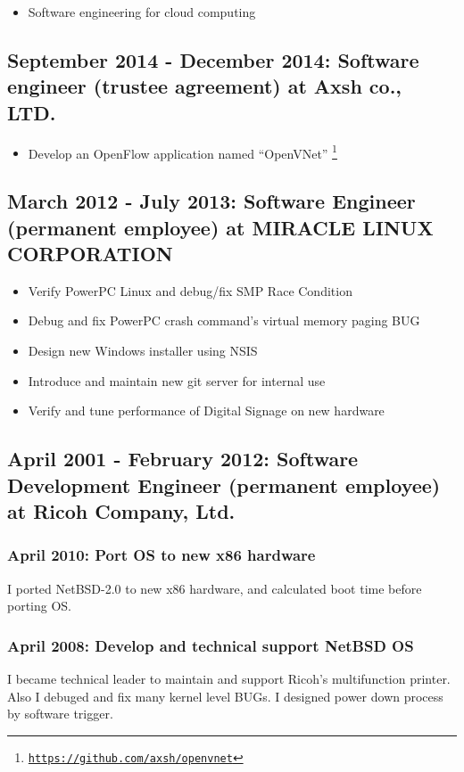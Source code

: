 \documentclass[letterpaper]{article}
\begin{document}
\begin{itemize}
  \item Software engineering for cloud computing
\end{itemize}

\subsection*{September 2014 - December 2014: Software engineer (trustee agreement) at Axsh co., LTD.}

\begin{itemize}
  \item Develop an OpenFlow application named ``OpenVNet'' \footnote{\href{https://github.com/axsh/openvnet}{\tt https://github.com/axsh/openvnet}}
\end{itemize}

\subsection*{March 2012 - July 2013: Software Engineer (permanent employee) at MIRACLE LINUX CORPORATION}

\begin{itemize}
  \item Verify PowerPC Linux and debug/fix SMP Race Condition
  \item Debug and fix PowerPC crash command's virtual memory paging BUG
  \item Design new Windows installer using NSIS
  \item Introduce and maintain new git server for internal use
  \item Verify and tune performance of Digital Signage on new hardware
\end{itemize}

\subsection*{April 2001 - February 2012: Software Development Engineer (permanent employee) at Ricoh Company, Ltd.}
\subsubsection*{April 2010: Port OS to new x86 hardware}
I ported NetBSD-2.0 to new x86 hardware, and calculated boot time before porting OS.

\subsubsection*{April 2008: Develop and technical support NetBSD OS}
I became technical leader to maintain and support Ricoh's multifunction printer.
Also I debuged and fix many kernel level BUGs.
I designed power down process by software trigger.
\end{document}
